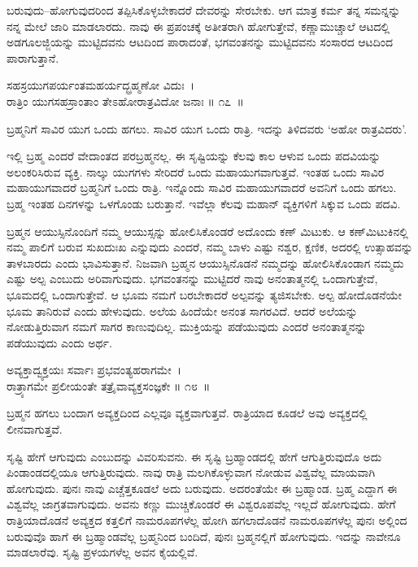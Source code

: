 ಬರುವುದು–ಹೋಗುವುದರಿಂದ ತಪ್ಪಿಸಿಕೊಳ್ಳಬೇಕಾದರೆ ದೇವರನ್ನು ಸೇರಬೇಕು. ಆಗ ಮಾತ್ರ ಕರ್ಮ ತನ್ನ ಸಮನ್ನನ್ನು ನನ್ನ ಮೇಲೆ ಜಾರಿ ಮಾಡಲಾರದು. ನಾವು ಈ ಪ್ರಪಂಚಕ್ಕೆ ಅತೀತರಾಗಿ ಹೋಗುತ್ತೇವೆ, ಕಣ್ಣಾಮುಚ್ಚಾಲೆ ಆಟದಲ್ಲಿ ಅಡಗೂಲಜ್ಜಿಯನ್ನು ಮುಟ್ಟಿದವನು ಆಟದಿಂದ ಪಾರಾದಂತೆ, ಭಗವಂತನನ್ನು ಮುಟ್ಟಿದವನು ಸಂಸಾರದ ಆಟದಿಂದ ಪಾರಾಗುತ್ತಾನೆ.

\begin{shloka}
ಸಹಸ್ರಯುಗಪರ್ಯಂತಮಹರ್ಯದ್ಬ್ರಹ್ಮಣೋ ವಿದುಃ~।\\ರಾತ್ರಿಂ ಯುಗಸಹಸ್ರಾಂತಾಂ ತೇಽಹೋರಾತ್ರವಿದೋ ಜನಾಃ \hfill॥ ೧೭~॥
\end{shloka}

\begin{artha}
ಬ್ರಹ್ಮನಿಗೆ ಸಾವಿರ ಯುಗ ಒಂದು ಹಗಲು. ಸಾವಿರ ಯುಗ ಒಂದು ರಾತ್ರಿ. ಇದನ್ನು ತಿಳಿದವರು ‘ಅಹೋ ರಾತ್ರವಿದರು’.
\end{artha}

ಇಲ್ಲಿ ಬ್ರಹ್ಮ ಎಂದರೆ ವೇದಾಂತದ ಪರಬ್ರಹ್ಮನಲ್ಲ. ಈ ಸೃಷ್ಟಿಯನ್ನು ಕೆಲವು ಕಾಲ ಆಳುವ ಒಂದು ಪದವಿಯನ್ನು ಅಲಂಕರಿಸಿರುವ ವ್ಯಕ್ತಿ. ನಾಲ್ಕು ಯುಗಗಳು ಸೇರಿದರೆ ಒಂದು ಮಹಾಯುಗವಾಗುತ್ತವೆ. ಇಂತಹ ಒಂದು ಸಾವಿರ ಮಹಾಯುಗವಾದರೆ ಬ್ರಹ್ಮನಿಗೆ ಒಂದು ರಾತ್ರಿ. ಇನ್ನೊಂದು ಸಾವಿರ ಮಹಾಯುಗವಾದರೆ ಅವನಿಗೆ ಒಂದು ಹಗಲು. ಬ್ರಹ್ಮ ಇಂತಹ ದಿನಗಳನ್ನು ಒಳಗೊಂಡು ಬರುತ್ತಾನೆ. ಇವೆಲ್ಲಾ ಕೆಲವು ಮಹಾನ್ ವ್ಯಕ್ತಿಗಳಿಗೆ ಸಿಕ್ಕುವ ಒಂದು ಪದವಿ.

ಬ್ರಹ್ಮನ ಆಯುಸ್ಸಿನೊಂದಿಗೆ ನಮ್ಮ ಆಯುಸ್ಸನ್ನು ಹೋಲಿಸಿಕೊಂಡರೆ ಅದೊಂದು ಕಣ್ ಮಿಟುಕು. ಆ ಕಣ್​ಮಿಟುಕಿನಲ್ಲಿ ನಮ್ಮ ಪಾಲಿಗೆ ಬರುವ ಸುಖದುಃಖ ಎನ್ನುವುದು ಎಂದರೆ, ನಮ್ಮ ಬಾಳು ಎಷ್ಟು ನಶ್ವರ, ಕ್ಷಣಿಕ, ಅದರಲ್ಲಿ ಉತ್ಸಾಹವನ್ನು ತಾಳಬಾರದು ಎಂದು ಭಾವಿಸುತ್ತಾನೆ. ನಿಜವಾಗಿ ಬ್ರಹ್ಮನ ಆಯುಸ್ಸಿನೊಡನೆ ನಮ್ಮದನ್ನು ಹೋಲಿಸಿಕೊಂಡಾಗ ನಮ್ಮದು ಎಷ್ಟು ಅಲ್ಪ ಎಂಬುದು ಅರಿವಾಗುವುದು. ಭಗವಂತನನ್ನು ಮುಟ್ಟಿದರೆ ನಾವು ಅನಂತಾತ್ಮನಲ್ಲಿ ಒಂದಾಗುತ್ತೇವೆ, ಭೂಮದಲ್ಲಿ ಒಂದಾಗುತ್ತೇವೆ. ಆ ಭೂಮ ನಮಗೆ ಬರಬೇಕಾದರೆ ಅಲ್ಪವನ್ನು ತ್ಯಜಿಸಬೇಕು. ಅಲ್ಪ ಹೋದೊಡನೆಯೇ ಭೂಮ ತಾನಿರುವೆ ಎಂದು ಹೇಳುವುದು. ಅಲೆಯ ಹಿಂದೆಯೇ ಅನಂತ ಸಾಗರವಿದೆ. ಆದರೆ ಅಲೆಯನ್ನು ನೋಡುತ್ತಿರುವಾಗ ನಮಗೆ ಸಾಗರ ಕಾಣುವುದಿಲ್ಲ. ಮುಕ್ತಿಯನ್ನು ಪಡೆಯುವುದು ಎಂದರೆ ಅನಂತಾತ್ಮನನ್ನು ಪಡೆಯುವುದು ಎಂದು ಅರ್ಥ.

\begin{shloka}
ಅವ್ಯಕ್ತಾದ್ವ್ಯಕ್ತಯಃ ಸರ್ವಾಃ ಪ್ರಭವಂತ್ಯಹರಾಗಮೇ~।\\ರಾತ್ರ್ಯಾಗಮೇ ಪ್ರಲೀಯಂತೇ ತತ್ರೈವಾವ್ಯಕ್ತಸಂಜ್ಞಕೇ \hfill॥ ೧೮~॥
\end{shloka}

\begin{artha}
ಬ್ರಹ್ಮನ ಹಗಲು ಬಂದಾಗ ಅವ್ಯಕ್ತದಿಂದ ಎಲ್ಲವೂ ವ್ಯಕ್ತವಾಗುತ್ತವೆ. ರಾತ್ರಿಯಾದ ಕೂಡಲೆ ಅವು ಅವ್ಯಕ್ತದಲ್ಲಿ ಲೀನವಾಗುತ್ತವೆ.
\end{artha}

ಸೃಷ್ಟಿ ಹೇಗೆ ಆಗುವುದು ಎಂಬುದನ್ನು ವಿವರಿಸುವನು. ಈ ಸೃಷ್ಟಿ ಬ್ರಹ್ಮಾಂಡದಲ್ಲಿ ಹೇಗೆ ಆಗುತ್ತಿರುವುದೊ ಅದು ಪಿಂಡಾಂಡದಲ್ಲಿಯೂ ಆಗುತ್ತಿರುವುದು. ನಾವು ರಾತ್ರಿ ಮಲಗಿಕೊಳ್ಳುವಾಗ ನೋಡುವ ವಿಶ್ವವೆಲ್ಲ ಮಾಯವಾಗಿ ಹೋಗುವುದು. ಪುನಃ ನಾವು ಎಚ್ಚೆತ್ತಕೂಡಲೆ ಅದು ಬರುವುದು. ಅದರಂತೆಯೇ ಈ ಬ್ರಹ್ಮಾಂಡ. ಬ್ರಹ್ಮ ಎದ್ದಾಗ ಈ ವಿಶ್ವವೆಲ್ಲ ಜಾಗ್ರತವಾಗುವುದು. ಅವನು ಕಣ್ಣು ಮುಚ್ಚಿಕೊಂಡರೆ ಈ ವಿಶ್ವರೂಪವೆಲ್ಲ ಇಲ್ಲದೆ ಹೋಗುವುದು. ಹೇಗೆ ರಾತ್ರಿಯಾದೊಡನೆ ಅವ್ಯಕ್ತದ ಕತ್ತಲಿಗೆ ನಾಮರೂಪಗಳೆಲ್ಲ ಹೋಗಿ ಹಗಲಾದೊಡನೆ ನಾಮರೂಪಗಳೆಲ್ಲ ಪುನಃ ಅಲ್ಲಿಂದ ಬರುವುವೊ ಹಾಗೆ ಈ ಬ್ರಹ್ಮಾಂಡವೆಲ್ಲ ಬ್ರಹ್ಮನಿಂದ ಬಂದಿದೆ, ಪುನಃ ಬ್ರಹ್ಮನಲ್ಲಿಗೆ ಹೋಗುವುದು. ಇದನ್ನು ನಾವೇನೂ ಮಾಡಲಾರೆವು. ಸೃಷ್ಟಿ ಪ್ರಳಯಗಳೆಲ್ಲ ಅವನ ಕೈಯಲ್ಲಿವೆ.

